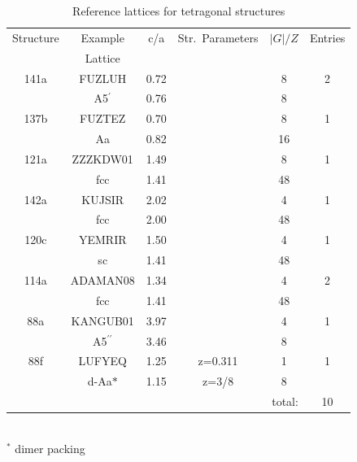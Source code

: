 \documentclass[preprint]{revtex4}              %
\begin{document}
\begin{table}
\caption{Reference lattices for tetragonal structures} \label{tet}
\begin{center}
\begin{tabular}{cccccc}%
\cline{1-6}
Structure & Example & c/a & Str.\ Parameters & $|G|/Z$ & Entries \\
          & Lattice \\
\cline{1-6}
141a    & FUZLUH    & 0.72 & & 8 & 2 \\
        & A5$^\prime$&0.76 & & 8 \\
137b    & FUZTEZ    & 0.70 & & 8 & 1 \\
        & Aa        & 0.82 & & 16 \\
121a    & ZZZKDW01  & 1.49 & & 8 & 1 \\
        & fcc       & 1.41 & & 48 \\
142a    & KUJSIR    & 2.02 & & 4 & 1 \\
        & fcc       & 2.00 & & 48 \\
120c    & YEMRIR    & 1.50 & & 4 & 1 \\
        & sc        & 1.41 & & 48 \\
114a    & ADAMAN08  & 1.34 & & 4 & 2 \\
        & fcc       & 1.41 & & 48 \\
88a     & KANGUB01  & 3.97 & & 4 & 1 \\
        & A5$^{\prime\prime}$& 3.46&&8 \\
88f     & LUFYEQ    & 1.25 & z=0.311&1&1 \\
        & d-Aa$*$     & 1.15 & z=3/8&8 \\
\cline{6-6}
\multicolumn{5}{r}{total:} & 10 \\
\cline{1-6}
\end{tabular} \\
$^*$ dimer packing
\end{center}
\end{table}
\end{document}
